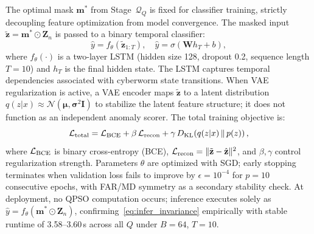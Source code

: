 \documentclass[conference]{IEEEtran}
\begin{document}
The optimal mask $\mathbf{m}^{*}$ from Stage~$\mathcal{Q}_{Q}$
is fixed for classifier training, strictly decoupling feature
optimization from model convergence. The masked input
$\tilde{\mathbf{z}}=\mathbf{m}^{*}\odot\mathbf{Z}_n$ is passed
to a binary temporal classifier:
\begin{equation}
\hat{y} = f_\theta(\tilde{\mathbf{z}}_{1:T}),\quad
\hat{y} = \sigma(\mathbf{W}h_T+b),
\label{eq:classifier}
\end{equation}
where $f_\theta(\cdot)$ is a two-layer LSTM (hidden size 128,
dropout 0.2, sequence length $T=10$) and $h_T$ is the final
hidden state. The LSTM captures temporal dependencies associated
with cyberworm state transitions. When VAE regularization is
active, a VAE encoder maps $\tilde{\mathbf{z}}$ to a latent
distribution $q(z|x)\approx\mathcal{N}(\boldsymbol{\mu},
\boldsymbol{\sigma}^2\mathbf{I})$ to stabilize the latent
feature structure; it does not function as an independent
anomaly scorer. The total training objective is:
\begin{equation}
\mathcal{L}_{\rm total} = \mathcal{L}_{\rm BCE}
+ \beta\,\mathcal{L}_{\rm recon}
+ \gamma\,D_{\rm KL}\!\left(q(z|x)\,\|\,p(z)\right),
\label{eq:total_loss}
\end{equation}
where $\mathcal{L}_{\rm BCE}$ is binary cross-entropy
(BCE), $\mathcal{L}_{\rm recon}=\|\tilde{\mathbf{z}}-
\hat{\mathbf{z}}\|^2$, and $\beta,\gamma$ control
regularization strength. Parameters $\theta$ are optimized
with SGD; early stopping terminates when validation loss fails
to improve by $\epsilon=10^{-4}$ for $p=10$ consecutive epochs,
with FAR/MD symmetry as a secondary stability check. At
deployment, no QPSO computation occurs; inference executes
solely as $\hat{y}=f_\theta(\mathbf{m}^{*}\odot\mathbf{Z}_n)$,
confirming~\eqref{eq:infer_invariance} empirically with
stable runtime of 3.58--3.60\,s across all $Q$ under
$B=64$, $T=10$.




\end{document}
